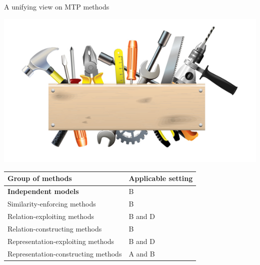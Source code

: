 \documentclass[]{beamer}
\renewcommand{\alert}[1]{\textbf{\color{putblue} #1}}
\begin{document}
\begin{frame}{A unifying view on MTP methods}

\begin{center}
\includegraphics[scale=0.3]{pics/tools}

\begin{tabular}{ll}
\hline
Group of methods & Applicable setting \\
\hline
\hline
\alert{Independent models} & B \\
Similarity-enforcing methods & B   \\ 
Relation-exploiting methods & B and D  \\
Relation-constructing methods & B \\
Representation-exploiting methods & B and D \\
Representation-constructing methods & A and B \\
\hline  
\end{tabular}
\end{center}
\end{frame}

\end{document}
